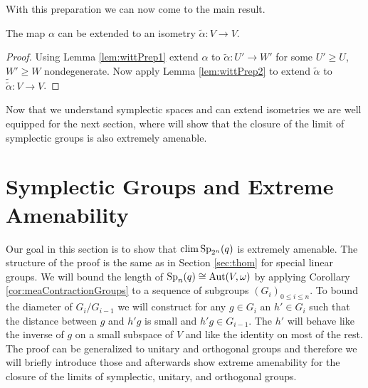 With this preparation we can now come to the main result.
\begin{corollary}\label{lem:witt}
	The map $\alpha$ can be extended to an isometry $\tilde{\alpha}\colon V\to V$.
\end{corollary}
\begin{proof}
	Using Lemma \ref{lem:wittPrep1} extend $\alpha$ to $\tilde{\alpha}\colon U'\to W'$ for some $U'\geq U$, $W'\geq W$ nondegenerate. Now apply Lemma \ref{lem:wittPrep2} to extend $\tilde{\alpha}$ to $\tilde{\tilde{\alpha}}\colon V\to V$.
\end{proof}
		
Now that we understand symplectic spaces and can extend isometries we are well equipped for the next section, where will show that the closure of the limit of symplectic groups is also extremely amenable.
		
		
\section{Symplectic Groups and Extreme Amenability}\label{sec:mySec}
		
		
Our goal in this section is to show that $\operatorname{clim} \operatorname{Sp}_{2^n}(q)$ is extremely amenable. The structure of the proof is the same as in Section \ref{sec:thom} for special linear groups. We will bound the length of $\operatorname{Sp}_n(q)\cong\operatorname{Aut}(V,\omega)$ by applying Corollary \ref{cor:meaContractionGroups} to a sequence of subgroups $(G_i)_{0\leq i\leq n}$. To bound the diameter of $G_i/G_{i-1}$ we will construct for any $g\in G_i$ an $h'\in G_i$ such that the distance between $g$ and $h'g$ is small and $h'g\in G_{i-1}$. The $h'$ will behave like the inverse of $g$ on a small subspace of $V$ and like the identity on most of the rest. The proof can be generalized to unitary and orthogonal groups and therefore we will briefly introduce those and afterwards show extreme amenability for the closure of the limits of symplectic, unitary, and orthogonal groups.
		
